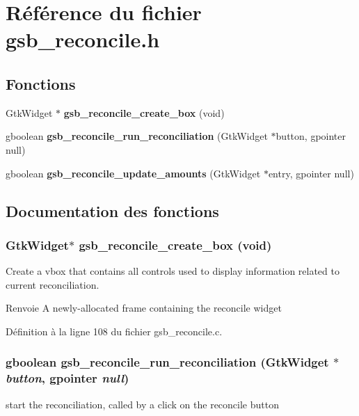 \section{Référence du fichier gsb\_\-reconcile.h}
\label{gsb__reconcile_8h}
\subsection*{Fonctions}
\begin{DoxyCompactItemize}
\item 
GtkWidget $\ast$ {\bf gsb\_\-reconcile\_\-create\_\-box} (void)
\item 
gboolean {\bf gsb\_\-reconcile\_\-run\_\-reconciliation} (GtkWidget $\ast$button, gpointer null)
\item 
gboolean {\bf gsb\_\-reconcile\_\-update\_\-amounts} (GtkWidget $\ast$entry, gpointer null)
\end{DoxyCompactItemize}


\subsection{Documentation des fonctions}
\subsubsection[{gsb\_\-reconcile\_\-create\_\-box}]{\setlength{\rightskip}{0pt plus 5cm}GtkWidget$\ast$ gsb\_\-reconcile\_\-create\_\-box (void)}\label{gsb__reconcile_8h_a0a935736f287cf69e6339d44fd1e2260}
Create a vbox that contains all controls used to display information related to current reconciliation.

\begin{DoxyReturn}{Renvoie}
A newly-\/allocated frame containing the reconcile widget 
\end{DoxyReturn}


Définition à la ligne 108 du fichier gsb\_\-reconcile.c.

\subsubsection[{gsb\_\-reconcile\_\-run\_\-reconciliation}]{\setlength{\rightskip}{0pt plus 5cm}gboolean gsb\_\-reconcile\_\-run\_\-reconciliation (GtkWidget $\ast$ {\em button}, \/  gpointer {\em null})}\label{gsb__reconcile_8h_a45c97884b1bd45b63b597a626c38f36d}
start the reconciliation, called by a click on the reconcile button


